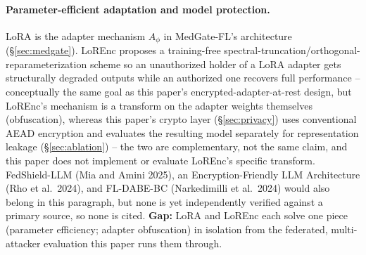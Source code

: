 \documentclass[11pt]{article}
\begin{document}
\paragraph{Parameter-efficient adaptation and model protection.} LoRA
\citep{hu2022lora} is the adapter mechanism $A_\phi$ in MedGate-FL's
architecture (\S\ref{sec:medgate}). LoREnc \citep{ahn2026lorenc} proposes a
training-free spectral-truncation/orthogonal-reparameterization scheme so an
unauthorized holder of a LoRA adapter gets structurally degraded outputs
while an authorized one recovers full performance -- conceptually the same
goal as this paper's encrypted-adapter-at-rest design, but LoREnc's
mechanism is a transform on the adapter weights themselves (obfuscation),
whereas this paper's crypto layer (\S\ref{sec:privacy}) uses conventional
AEAD encryption and evaluates the resulting model separately for
representation leakage (\S\ref{sec:ablation}) -- the two are complementary,
not the same claim, and this paper does not implement or evaluate LoREnc's
specific transform. FedShield-LLM (Mia and Amini 2025), an
Encryption-Friendly LLM Architecture (Rho et al.\ 2024), and FL-DABE-BC
(Narkedimilli et al.\ 2024) would also belong in this paragraph, but none
is yet independently verified against a primary source, so none is cited.
\textbf{Gap:} LoRA and LoREnc each solve one piece (parameter efficiency;
adapter obfuscation) in isolation from the federated, multi-attacker
evaluation this paper runs them through.
\end{document}
